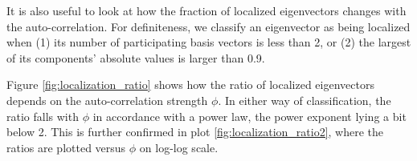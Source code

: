 \documentclass{report}
\begin{document}
It is also useful to look at how the fraction of localized eigenvectors
changes with the auto-correlation. For definiteness, we classify
an eigenvector as being localized when (1) its number of participating
basis vectors is less than 2, or (2) the largest of its components'
absolute values is larger than 0.9.

Figure \ref{fig:localization_ratio} shows how the ratio of localized
eigenvectors depends on the auto-correlation strength $\phi$. In
either way of classification, the ratio falls with $\phi$ in
accordance with a power law, the power exponent lying a bit below 2.
This is further confirmed in plot \ref{fig:localization_ratio2}, where
the ratios are plotted versus $\phi$ on log-log scale.

\end{document}
